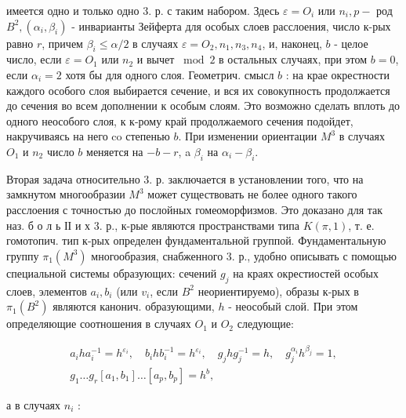 \documentclass[10pt]{article}
\begin{document}
имеется одно и только одно 3. р. с таким набором. Здесь $\varepsilon=O_{i}$ или $n_{i}, p-$ род $B^{2},\left(\alpha_{i}, \beta_{i}\right)$ - инварианты Зейферта для особых слоев расслоения, число к-рых равно $r$, причем $\beta_{i} \leqslant \alpha / 2$ в случаях $\varepsilon=O_{2}, n_{1}, n_{3}, n_{4}$, и, наконец, $b$ - целое число, если $\varepsilon=O_{1}$ или $n_{2}$ и вычет $\bmod 2$ в остальных случаях, при этом $b=0$, если $\alpha_{i}=2$ хотя бы для одного слоя. Геометрич. смысл $b$ : на крае окрестности каждого особого слоя выбирается сечение, и вся их совокупность продолжается до сечения во всем дополнении к особым слоям. Это возможно сделать вплоть до одного неособого слоя, к к-рому край продолжаемого сечения подойдет, накручиваясь на него co степенью $b$. При изменении ориентации $M^{3}$ в случаях $O_{1}$ и $n_{2}$ число $b$ меняется на $-b-r$, a $\beta_{i}$ на $\alpha_{i}-\beta_{i}$.



Вторая задача относительно 3. р. заключается в установлении того, что на замкнутом многообразии $M^{3}$ может существовать не более одного такого расслоения с точностью до послойных гомеоморфизмов. Это доказано для так наз. б о л ь ІІ и х 3. р., к-рые являются пространствами типа $K(\pi, 1)$, т. е. гомотопич. тип к-рых определен фундаментальной группой. Фундаментальную группу $\pi_{1}\left(M^{3}\right)$ многообразия, снабженного 3. р., удобно описывать с помощью специальной системы образующих: сечений $g_{j}$ на краях окрестиостей особых слоев, элементов $a_{i}, b_{i}$ (или $v_{i}$, если $B^{2}$ неориентируемо), образы к-рых в $\pi_{1}\left(B^{2}\right)$ являются канонич. образующими, $h$ - неособый слой. При этом определяющие соотношения в случаях $O_{1}$ и $O_{2}$ следующие:



\[

\begin{gathered}

a_{i} h a_{i}^{-1}=h^{\varepsilon_{i}}, \quad b_{i} h b_{i}^{-1}=h^{\varepsilon_{i}}, \quad g_{j} h g_{j}^{-1}=h, \quad g_{j}^{\alpha_{i}} h^{\beta_{j}}=1, \\

g_{1} \ldots g_{r}\left[a_{1}, b_{1}\right] \ldots\left[a_{p}, b_{p}\right]=h^{b},

\end{gathered}

\]



а в случаях $n_{i}$ :
\end{document}
